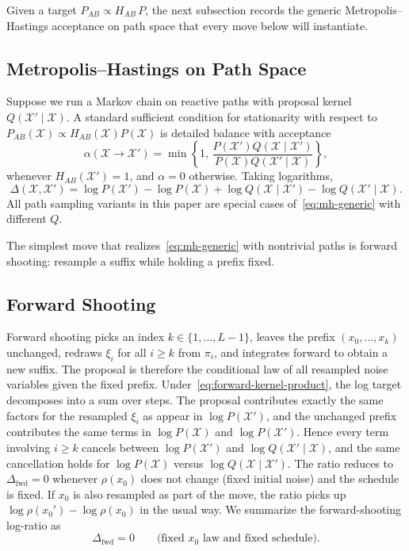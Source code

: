 Given a target $P_{AB} \propto H_{AB}\,P$, the next subsection records the generic
Metropolis--Hastings acceptance on path space that every move below will
instantiate.

\subsection{Metropolis--Hastings on Path Space}

Suppose we run a Markov chain on reactive paths with proposal kernel $Q(\mathcal{X}' \mid \mathcal{X})$. A standard sufficient condition for stationarity with respect to $P_{AB}(\mathcal{X}) \propto H_{AB}(\mathcal{X}) P(\mathcal{X})$ is detailed balance with acceptance
\begin{equation}
  \label{eq:mh-generic}
  \alpha(\mathcal{X} \to \mathcal{X}')
  = \min\left\{ 1,\,
    \frac{P(\mathcal{X}') Q(\mathcal{X} \mid \mathcal{X}')}
         {P(\mathcal{X}) Q(\mathcal{X}' \mid \mathcal{X})}
    \right\},
\end{equation}
whenever $H_{AB}(\mathcal{X}')=1$, and $\alpha=0$ otherwise. Taking logarithms,
\begin{equation}
  \label{eq:delta-generic}
  \Delta(\mathcal{X}, \mathcal{X}')
  = \log P(\mathcal{X}') - \log P(\mathcal{X})
  + \log Q(\mathcal{X} \mid \mathcal{X}') - \log Q(\mathcal{X}' \mid \mathcal{X}).
\end{equation}
All path sampling variants in this paper are special cases of~\eqref{eq:mh-generic} with different $Q$.

The simplest move that realizes~\eqref{eq:mh-generic} with nontrivial paths is
forward shooting: resample a suffix while holding a prefix fixed.

\subsection{Forward Shooting}

Forward shooting picks an index $k \in \{1,\ldots,L-1\}$, leaves the prefix $(x_0,\ldots,x_k)$ unchanged, redraws $\xi_i$ for all $i \geq k$ from $\pi_i$, and integrates forward to obtain a new suffix. The proposal is therefore the conditional law of all resampled noise variables given the fixed prefix. Under~\eqref{eq:forward-kernel-product}, the log target decomposes into a sum over steps. The proposal contributes exactly the same factors for the resampled $\xi_i$ as appear in $\log P(\mathcal{X}')$, and the unchanged prefix contributes the same terms in $\log P(\mathcal{X})$ and $\log P(\mathcal{X}')$. Hence every term involving $i \geq k$ cancels between $\log P(\mathcal{X}')$ and $\log Q(\mathcal{X}'\mid\mathcal{X})$, and the same cancellation holds for $\log P(\mathcal{X})$ versus $\log Q(\mathcal{X}\mid\mathcal{X}')$. The ratio reduces to $\Delta_{\mathrm{fwd}} = 0$ whenever $\rho(x_0)$ does not change (fixed initial noise) and the schedule is fixed. If $x_0$ is also resampled as part of the move, the ratio picks up $\log \rho(x_0') - \log \rho(x_0)$ in the usual way. We summarize the forward-shooting log-ratio as
\begin{equation}
  \label{eq:delta}
  \Delta_{\mathrm{fwd}} = 0
  \qquad\text{(fixed $x_0$ law and fixed schedule).}
\end{equation}

